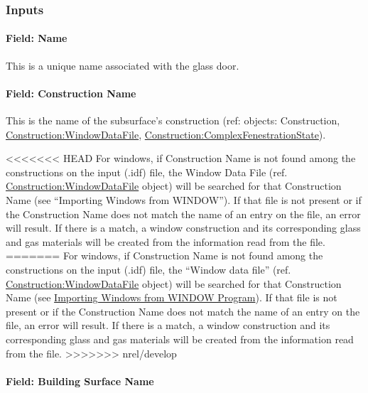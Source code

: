 \subsubsection{Inputs}\label{inputs-16-012}

\paragraph{Field: Name}\label{field-name-12-012}

This is a unique name associated with the glass door.

\paragraph{Field: Construction Name}\label{field-construction-name-12}

This is the name of the subsurface's construction (ref: objects: Construction, \hyperref[constructionwindowdatafile]{Construction:WindowDataFile}, \hyperref[constructioncomplexfenestrationstate]{Construction:ComplexFenestrationState}).

<<<<<<< HEAD
For windows, if Construction Name is not found among the constructions on the input (.idf) file, the Window Data File (ref. \hyperref[constructionwindowdatafile]{Construction:WindowDataFile} object) will be searched for that Construction Name (see ``Importing Windows from WINDOW''). If that file is not present or if the Construction Name does not match the name of an entry on the file, an error will result. If there is a match, a window construction and its corresponding glass and gas materials will be created from the information read from the file.
=======
For windows, if Construction Name is not found among the constructions on the input (.idf) file, the ``Window data file'' (ref. \hyperref[constructionwindowdatafile]{Construction:WindowDataFile} object) will be searched for that Construction Name (see \hyperref[importing-windows-from-window-program]{Importing Windows from WINDOW Program}). If that file is not present or if the Construction Name does not match the name of an entry on the file, an error will result. If there is a match, a window construction and its corresponding glass and gas materials will be created from the information read from the file.
>>>>>>> nrel/develop

\paragraph{Field: Building Surface Name}\label{field-building-surface-name-2}


